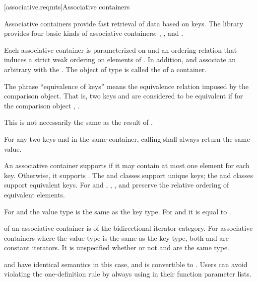 [associative.reqmts]{Associative containers}

\pnum
Associative containers provide fast retrieval of data based on keys.
The library provides four basic kinds of associative containers:
,
,
and
.

\pnum
Each associative container is parameterized on
and an ordering relation
that induces a strict weak ordering on
elements of
.
In addition,
and
associate an arbitrary 
with the
.
The object of type
is called the
of a container.

\pnum
The phrase ``equivalence of keys'' means the equivalence relation imposed by the
comparison object.
That is, two keys
and
are considered to be equivalent if for the
comparison object
,
.
\begin{note}
This is not necessarily the same as the result of .
\end{note}
For any two keys
and
in the same container, calling
shall always return the same value.

\pnum
An associative container supports  if it may contain at
most one element for each key. Otherwise, it supports .
The  and  classes support unique keys; the 
and  classes support equivalent keys.
For  and ,
, , and  preserve the relative ordering
of equivalent elements.

\pnum
For  and  the value type is the same as the key type.
For  and  it is equal to .

\pnum
{}
of an associative container is of the bidirectional iterator category.
For associative containers where the value type is the same as the key type, both
and
are constant iterators. It is unspecified whether or not
and
are the same type.
\begin{note}
 and  have identical semantics in this case, and  is convertible to . Users can avoid violating the one-definition rule by always using  in their function parameter lists.
\end{note}

